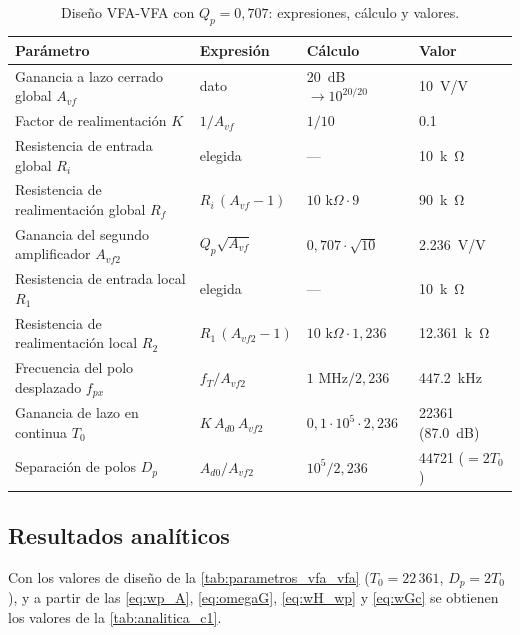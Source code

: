 \begin{table}[H]
\centering
\caption{Diseño VFA-VFA con $Q_p = 0{,}707$: expresiones, cálculo y valores.}
\label{tab:parametros_vfa_vfa}
\footnotesize
\setlength{\tabcolsep}{4pt}
\begin{tabular}{>{\raggedright\arraybackslash}p{} >{\centering\arraybackslash}p{} >{\centering\arraybackslash}p{} >{\centering\arraybackslash}p{}}
\toprule
\textbf{Parámetro} & \textbf{Expresión} & \textbf{Cálculo} & \textbf{Valor} \\
\midrule
Ganancia a lazo cerrado global $A_{vf}$ & dato & \SI{20}{dB} $\rightarrow 10^{20/20}$ & \SI{10}{V/V} \\
Factor de realimentación $K$ & $1/A_{vf}$ & $1/10$ & \num{0,1} \\
Resistencia de entrada global $R_i$ & elegida & --- & \SI{10}{k\ohm} \\
Resistencia de realimentación global $R_f$ & $R_i\,(A_{vf}-1)$ & $10\text{ k}\Omega \cdot 9$ & \SI{90}{k\ohm} \\
Ganancia del segundo amplificador $A_{vf2}$ & $Q_p\sqrt{A_{vf}}$ & $0{,}707\cdot\sqrt{10}$ & \SI{2,236}{V/V} \\
Resistencia de entrada local $R_1$ & elegida & --- & \SI{10}{k\ohm} \\
Resistencia de realimentación local $R_2$ & $R_1\,(A_{vf2}-1)$ & $10\text{ k}\Omega\cdot 1{,}236$ & \SI{12,361}{k\ohm} \\
Frecuencia del polo desplazado $f_{px}$ & $f_T/A_{vf2}$ & $1\text{ MHz}/2{,}236$ & \SI{447,2}{kHz} \\
Ganancia de lazo en continua $T_0$ & $K\,A_{d0}\,A_{vf2}$ & $0{,}1\cdot 10^5 \cdot 2{,}236$ & \num{22361} (\SI{87,0}{dB}) \\
Separación de polos $D_p$ & $A_{d0}/A_{vf2}$ & $10^5/2{,}236$ & \num{44721} ($=2T_0$) \\
\bottomrule
\end{tabular}
\end{table}

\subsection{Resultados analíticos}
\label{sec:analitico_c1}

Con los valores de diseño de la \autoref{tab:parametros_vfa_vfa} ($T_0 = 22\,361$, $D_p = 2T_0$), y a partir de las \autoref{eq:wp_A}, \autoref{eq:omegaG}, \autoref{eq:wH_wp} y \autoref{eq:wGc} se obtienen los valores de la \autoref{tab:analitica_c1}.

